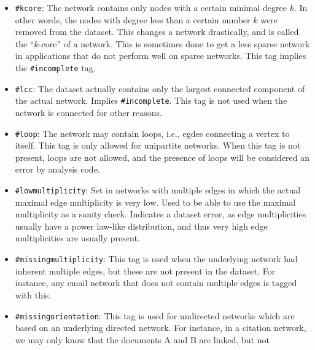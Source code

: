 \documentclass{article}
\begin{document}
\begin{itemize}
  \emph{X} is some other network, are of this type. 
  Networks that have this tag may have skewed properties, such as skewed
  degree distributions.  In KONECT, we recommend to \emph{not} generate
  the join of a given network, but to publish the underlying network(s)
  itself.  However, many networks are only known as their join, and thus
  are included in KONECT.  (Note that in many cases, the self join has
  been used to make a unipartite network out of a bipartite one, in
  order to apply network analysis methods that otherwise do not apply to
  bipartite networks.)
\item \texttt{\#kcore}: The network contains only nodes with a
  certain minimal degree $k$. In other words, the nodes with
  degree less than a certain number $k$ were removed from the
  dataset.  This changes a network drastically, and is called
  the ``$k$-core'' of a network. This is sometimes done to get
  a less sparse network in applications that do not perform well
  on sparse networks. This tag implies the
  \texttt{\#incomplete} tag.
\item \texttt{\#lcc}:  The dataset actually contains only the
  largest connected component of the actual network.  Implies
  \texttt{\#incomplete}.  This tag is not used when the network
  is connected for other reasons. 
\item \texttt{\#loop}: The network may contain loops, i.e.,
  egdes connecting a vertex to itself.  This tag is only
  allowed for unipartite networks.  When this tag is not
  present, loops are not allowed, and the presence of loops
  will be considered an error by analysis code.
\item \texttt{\#lowmultiplicity}:  Set in networks with multiple
  edges in which the actual maximal edge multiplicity is very
  low.  Used to be able to use the maximal multiplicity as a
  sanity check.  Indicates a dataset error, as edge
  multiplicities usually have a power law-like distribution, and
  thus very high edge multiplicities are usually present. 
\item \texttt{\#missingmultiplicity}:  This tag is used when the
  underlying network had inherent multiple edges, but these are
  not present in the dataset.  For instance, any email network
  that does not contain multiple edges is tagged with this. 
\item \texttt{\#missingorientation}: This tag is used for
  undirected networks which are based on an underlying
  directed network.  For instance, in a citation network, we
  may only know that the documents A and B are linked, but not

\end{itemize}
\end{document}
